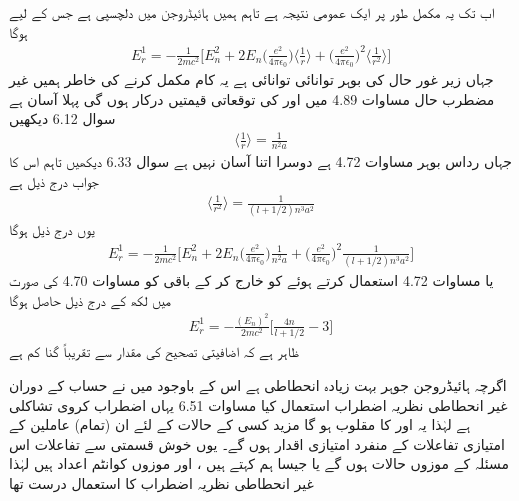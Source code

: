 اب تک یہ مکمل طور پر ایک عمومی نتیجہ ہے تاہم ہمیں ہائیڈروجن میں دلچسپی ہے جس کے لیے  ہوگا 
\begin{align} 
E_r^1 = - \frac{1}{2mc^2} \big [ E_n^2 + 2E_n \big(\frac{e^2}{4 \pi \epsilon_0}\big) \big\langle \frac{1}{r} \big\rangle + \big(\frac{e^2}{4 \pi \epsilon_0}\big)^2 \big\langle \frac{1}{r^2} \big\rangle \big ]
\end{align} 
جہاں  زیر غور حال کی بوہر توانائی توانائی ہے یہ کام مکمل کرنے کی خاطر ہمیں غیر مضطرب حال  مساوات 4.89 میں  اور  کی توقعاتی قیمتیں درکار ہوں گی پہلا آسان ہے سوال 6.12 دیکھیں 
\begin{align}
\big\langle \frac{1}{r} \big\rangle = \frac{1}{n^2 a}
\end{align}
جہاں  رداس بوہر مساوات 4.72 ہے دوسرا اتنا آسان نہیں ہے سوال 6.33 دیکھیں تاہم اس کا جواب درج ذیل ہے 
\begin{align}
\big\langle \frac{1}{r^2} \big\rangle = \frac{1}{(l + 1/2)n^3 a^2}
\end{align}
یوں درج ذیل ہوگا 
\begin{align*}
E_r^1 = - \frac{1}{2mc^2} \big [ E_n^2 + 2 E_n \big(\frac{e^2}{4 \pi \epsilon_0}\big) \frac{1}{n^2 a} + \big(\frac{e^2}{4 \pi \epsilon_0}\big)^2 \frac{1}{(l + 1/2)n^3 a^2} \big ]
\end{align*}
یا مساوات 4.72 استعمال کرتے ہوئے  کو خارج  کر کے  باقی کو  مساوات 4.70 کی صورت میں لکھ کے درج ذیل حاصل ہوگا 
\begin{align}
E_r^1 = - \frac{(E_n)^2}{2mc^2} \big [ \frac{4n}{l + 1/2} - 3 \big ]
\end{align}
ظاہر ہے کہ اضافیتی تصحیح کی مقدار  سے تقریباً   گنا کم ہے 

اگرچہ ہائیڈروجن جوہر بہت زیادہ انحطاطی ہے اس کے باوجود میں نے حساب کے دوران غیر انحطاطی نظریہ اضطراب استعمال کیا مساوات 6.51 یہاں اضطراب کروی تشاکلی ہے  لہٰذا    یہ  اور  کا مقلوب ہو گا مزید کسی  کے   حالات کے لئے ان (تمام) عاملین کے امتیازی تفاعلات کے منفرد امتیازی اقدار ہوں گے۔  یوں خوش قسمتی سے تفاعلات  اس مسئلہ کے موزوں حالات  ہوں گے  یا جیسا ہم کہتے ہیں ،  اور  موزوں کوانٹم اعداد ہیں  لہٰذا   غیر انحطاطی نظریہ اضطراب کا استعمال درست تھا 

